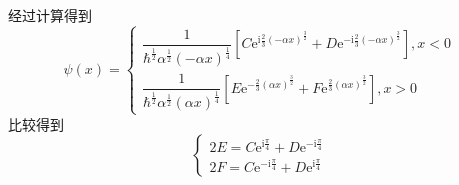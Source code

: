 \documentclass[12pt, a4paper, oneside]{ctexart}
\begin{document}
	\quad\quad 经过计算得到
	\begin{equation}
		\psi(x)=\left\{\begin{matrix}
			\dfrac{1}{\hbar^{\frac{1}{2}}\alpha^{\frac{1}{2}}(-\alpha x)^{\frac{1}{4}}}\left[C\mathrm{e}^{\mathrm{i}\frac{2}{3}(-\alpha x)^{\frac{3}{2}}}+D\mathrm{e}^{-\mathrm{i}\frac{2}{3}(-\alpha x)^{\frac{3}{2}}}\right],x<0	\\\dfrac{1}{\hbar^{\frac{1}{2}}\alpha^{\frac{1}{2}}(\alpha x)^{\frac{1}{4}}}\left[E\mathrm{e}^{-\frac{2}{3}(\alpha x)^{\frac{3}{2}}}+F\mathrm{e}^{\frac{2}{3}(\alpha x)^{\frac{3}{2}}}\right],x>0
		\end{matrix}\right.
	\end{equation}
	\quad\quad 比较得到
	\begin{equation}
		\left\{\begin{matrix}
		2E=C\mathrm{e}^{\mathrm{i}\frac{\pi}{4}}+D\mathrm{e}^{-\mathrm{i}\frac{\pi}{4}}	\\2F=C\mathrm{e}^{-\mathrm{i}\frac{\pi}{4}}+D\mathrm{e}^{\mathrm{i}\frac{\pi}{4}}
		\end{matrix}\right.
	\end{equation}
\end{document}
